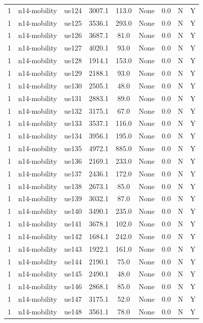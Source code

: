 \begin{table}[ht]
\begin{tabular}{|c|c|c|c|c|c|c|c|c|}
1 & n14-mobility & ue124 & 3007.1 & 113.0 & None & 0.0 & N & Y \\
1 & n14-mobility & ue125 & 3536.1 & 293.0 & None & 0.0 & N & Y \\
1 & n14-mobility & ue126 & 3687.1 & 81.0 & None & 0.0 & N & Y \\
1 & n14-mobility & ue127 & 4020.1 & 93.0 & None & 0.0 & N & Y \\
1 & n14-mobility & ue128 & 1914.1 & 153.0 & None & 0.0 & N & Y \\
1 & n14-mobility & ue129 & 2188.1 & 93.0 & None & 0.0 & N & Y \\
1 & n14-mobility & ue130 & 2505.1 & 48.0 & None & 0.0 & N & Y \\
1 & n14-mobility & ue131 & 2883.1 & 89.0 & None & 0.0 & N & Y \\
1 & n14-mobility & ue132 & 3175.1 & 67.0 & None & 0.0 & N & Y \\
1 & n14-mobility & ue133 & 3537.1 & 116.0 & None & 0.0 & N & Y \\
1 & n14-mobility & ue134 & 3956.1 & 195.0 & None & 0.0 & N & Y \\
1 & n14-mobility & ue135 & 4972.1 & 885.0 & None & 0.0 & N & Y \\
1 & n14-mobility & ue136 & 2169.1 & 233.0 & None & 0.0 & N & Y \\
1 & n14-mobility & ue137 & 2436.1 & 172.0 & None & 0.0 & N & Y \\
1 & n14-mobility & ue138 & 2673.1 & 85.0 & None & 0.0 & N & Y \\
1 & n14-mobility & ue139 & 3032.1 & 87.0 & None & 0.0 & N & Y \\
1 & n14-mobility & ue140 & 3490.1 & 235.0 & None & 0.0 & N & Y \\
1 & n14-mobility & ue141 & 3678.1 & 102.0 & None & 0.0 & N & Y \\
1 & n14-mobility & ue142 & 1684.1 & 242.0 & None & 0.0 & N & Y \\
1 & n14-mobility & ue143 & 1922.1 & 161.0 & None & 0.0 & N & Y \\
1 & n14-mobility & ue144 & 2190.1 & 75.0 & None & 0.0 & N & Y \\
1 & n14-mobility & ue145 & 2490.1 & 48.0 & None & 0.0 & N & Y \\
1 & n14-mobility & ue146 & 2868.1 & 85.0 & None & 0.0 & N & Y \\
1 & n14-mobility & ue147 & 3175.1 & 52.0 & None & 0.0 & N & Y \\
1 & n14-mobility & ue148 & 3561.1 & 78.0 & None & 0.0 & N & Y \\

\end{tabular}
\end{table}
